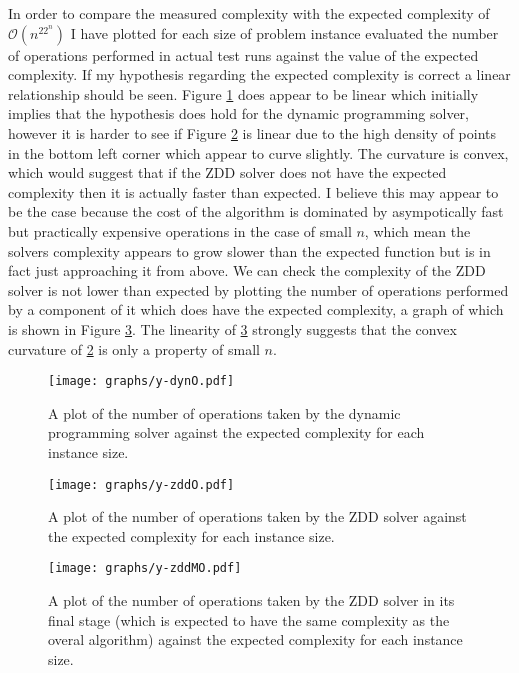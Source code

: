 \documentclass[12pt,a4paper,twoside,openright]{report}
\begin{document}
In order to compare the measured complexity with the expected complexity of $\mathcal{O}(n^22^n)$ I have plotted for each size of problem instance evaluated the number of operations performed in actual test runs against the value of the expected complexity. If my hypothesis regarding the expected complexity is correct a linear relationship should be seen. Figure \ref{dynoperations} does appear to be linear which initially implies that the hypothesis does hold for the dynamic programming solver, however it is harder to see if Figure \ref{zddoperations} is linear due to the high density of points in the bottom left corner which appear to curve slightly. The curvature is convex, which would suggest that if the ZDD solver does not have the expected complexity then it is actually faster than expected. I believe this may appear to be the case because the cost of the algorithm is dominated by asympotically fast but practically expensive operations in the case of small $n$, which mean the solvers complexity appears to grow slower than the expected function but is in fact just approaching it from above. We can check the complexity of the ZDD solver is not lower than expected by plotting the number of operations performed by a component of it which does have the expected complexity, a graph of which is shown in Figure \ref{zddmodoperations}. The linearity of \ref{zddmodoperations} strongly suggests that the convex curvature of \ref{zddoperations} is only a property of small $n$.

\begin{figure}[ht]
\centering
\texttt{[image: graphs/y-dynO.pdf]}
\caption{A plot of the number of operations taken by the dynamic programming solver against the expected complexity for each instance size.}
\label{dynoperations}
\end{figure}

\begin{figure}[ht]
\centering
\texttt{[image: graphs/y-zddO.pdf]}
\caption{A plot of the number of operations taken by the ZDD solver against the expected complexity for each instance size.}
\label{zddoperations}
\end{figure}

\begin{figure}[ht]
\centering
\texttt{[image: graphs/y-zddMO.pdf]}
\caption{A plot of the number of operations taken by the ZDD solver in its final stage (which is expected to have the same complexity as the overal algorithm) against the expected complexity for each instance size.}
\label{zddmodoperations}
\end{figure}
\end{document}
